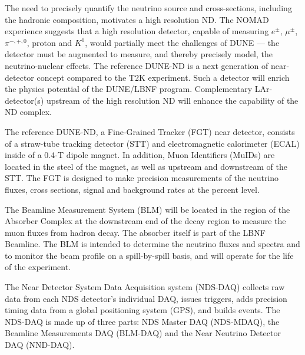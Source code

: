 The need to precisely quantify the neutrino source and
cross-sections, including the hadronic composition, motivates
a high resolution ND. The NOMAD experience suggests that a high
resolution detector, capable of measuring $e^{\pm}$, $\mu^{\pm}$,
$\pi^{-,+,0}$, proton and $K^{0}$, would partially meet the
challenges of DUNE --- the detector must be augmented to measure, and
thereby precisely model, the neutrino-nuclear effects. The reference
DUNE-ND is a next generation of near-detector concept
compared to the T2K experiment. Such a detector will
enrich the physics potential of the DUNE/LBNF program.  Complementary
LAr-detector(s) upstream of the high resolution ND will enhance the
capability of the ND complex.


The reference DUNE-ND, a Fine-Grained Tracker (FGT) near detector,
consists of a straw-tube tracking detector (STT) and electromagnetic
calorimeter (ECAL) inside of a 0.4-T dipole magnet. In addition, Muon
Identifiers (MuIDs) are located in the steel of the magnet, as well as
upstream and downstream of the STT. The FGT is designed to make
precision measurements of the neutrino fluxes, cross sections, signal
and background rates at the percent level.

The Beamline Measurement System (BLM) will be located in the region of
the Absorber Complex at the downstream end of the decay region to
measure the muon fluxes from hadron decay. The absorber itself is part
of the LBNF Beamline.  The BLM is intended to determine the neutrino
fluxes and spectra and to monitor the beam profile on a spill-by-spill
basis, and will operate for the life of the experiment.

The Near Detector System Data Acquisition system (NDS-DAQ) collects
raw data from each NDS detector's individual DAQ, issues triggers,
adds precision timing data from a global positioning system (GPS), and
builds events.  The NDS-DAQ is made up of three parts: NDS Master DAQ
(NDS-MDAQ), the Beamline Measurements DAQ (BLM-DAQ) and the Near
Neutrino Detector DAQ (NND-DAQ).
